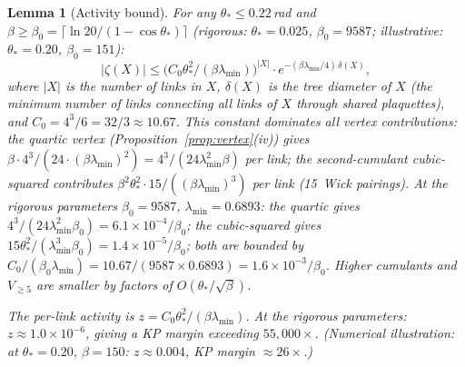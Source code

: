 \documentclass[11pt]{article}
\newtheorem{lemma}[theorem]{Lemma}
\theoremstyle{definition}
\begin{document}
\begin{lemma}[Activity bound]\label{lem:activity}
For any $\theta_*\le 0.22$\,rad and $\beta\ge\beta_0
=\lceil\ln 20/(1-\cos\theta_*)\rceil$
(rigorous: $\theta_*=0.025$, $\beta_0=9587$;
illustrative: $\theta_*=0.20$, $\beta_0=151$):
\begin{equation}
|\zeta(X)|\le\bigl(C_0\theta_*^2/(\beta\lambda_{\min})\bigr)^{|X|}
\cdot e^{-(\beta\lambda_{\min}/4)\,\delta(X)},
\end{equation}
where $|X|$ is the number of links in $X$, $\delta(X)$ is the
tree diameter of $X$ (the minimum number of links connecting all
links of $X$ through shared plaquettes), and
$C_0=4^3/6=32/3\approx 10.67$.  This constant dominates
all vertex contributions: the quartic vertex
(Proposition~\ref{prop:vertex}(iv)) gives
$\beta\cdot 4^3/(24\cdot(\beta\lambda_{\min})^2)
=4^3/(24\lambda_{\min}^2\beta)$ per link; the second-cumulant
cubic-squared contributes
$\beta^2\theta_*^2\cdot 15/((\beta\lambda_{\min})^3)$ per link
(15~Wick pairings).  At the rigorous parameters
$\beta_0=9587$, $\lambda_{\min}=0.6893$:
the quartic gives $4^3/(24\lambda_{\min}^2\beta_0)
=6.1\times 10^{-4}/\beta_0$; the cubic-squared gives
$15\theta_*^2/(\lambda_{\min}^3\beta_0)
=1.4\times 10^{-5}/\beta_0$; both are bounded by
$C_0/(\beta_0\lambda_{\min})
=10.67/(9587\times 0.6893)
=1.6\times 10^{-3}/\beta_0$.
Higher cumulants and $V_{\ge 5}$ are smaller by factors of
$O(\theta_*/\sqrt{\beta})$.

The per-link activity is $z=C_0\theta_*^2/(\beta\lambda_{\min})$.
At the rigorous parameters: $z\approx 1.0\times 10^{-6}$,
giving a KP margin exceeding $55{,}000\times$.
\emph{(Numerical illustration: at $\theta_*=0.20$,
$\beta=150$: $z\approx 0.004$, KP margin $\approx 26\times$.)}
\end{lemma}
\end{document}
